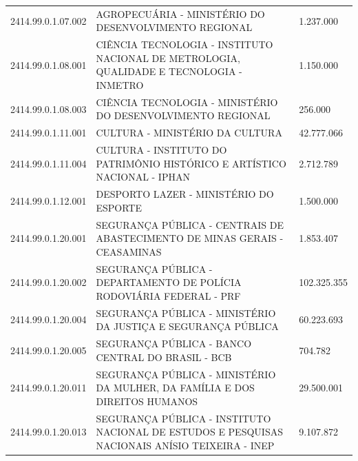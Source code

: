 \documentclass{article}
\begin{document}
\begin{longtable}[c]{m{2cm}|m{13cm}|m{2cm}}
\multicolumn{1}{C{2cm}|}{2414.99.0.1.07.002} & \multicolumn{1}{L{13cm}|}{AGROPECUÁRIA - MINISTÉRIO DO DESENVOLVIMENTO REGIONAL} & \multicolumn{1}{R{2cm}}{1.237.000} \\
\multicolumn{1}{C{2cm}|}{2414.99.0.1.08.001} & \multicolumn{1}{L{13cm}|}{CIÊNCIA TECNOLOGIA - INSTITUTO NACIONAL DE METROLOGIA, QUALIDADE E TECNOLOGIA - INMETRO} & \multicolumn{1}{R{2cm}}{1.150.000} \\
\multicolumn{1}{C{2cm}|}{2414.99.0.1.08.003} & \multicolumn{1}{L{13cm}|}{CIÊNCIA TECNOLOGIA - MINISTÉRIO DO DESENVOLVIMENTO REGIONAL} & \multicolumn{1}{R{2cm}}{256.000} \\
\multicolumn{1}{C{2cm}|}{2414.99.0.1.11.001} & \multicolumn{1}{L{13cm}|}{CULTURA - MINISTÉRIO DA CULTURA} & \multicolumn{1}{R{2cm}}{42.777.066} \\
\multicolumn{1}{C{2cm}|}{2414.99.0.1.11.004} & \multicolumn{1}{L{13cm}|}{CULTURA - INSTITUTO DO PATRIMÔNIO HISTÓRICO E ARTÍSTICO NACIONAL - IPHAN} & \multicolumn{1}{R{2cm}}{2.712.789} \\
\multicolumn{1}{C{2cm}|}{2414.99.0.1.12.001} & \multicolumn{1}{L{13cm}|}{DESPORTO LAZER - MINISTÉRIO DO ESPORTE} & \multicolumn{1}{R{2cm}}{1.500.000} \\
\multicolumn{1}{C{2cm}|}{2414.99.0.1.20.001} & \multicolumn{1}{L{13cm}|}{SEGURANÇA PÚBLICA - CENTRAIS DE ABASTECIMENTO DE MINAS GERAIS - CEASAMINAS} & \multicolumn{1}{R{2cm}}{1.853.407} \\
\multicolumn{1}{C{2cm}|}{2414.99.0.1.20.002} & \multicolumn{1}{L{13cm}|}{SEGURANÇA PÚBLICA - DEPARTAMENTO DE POLÍCIA RODOVIÁRIA FEDERAL - PRF} & \multicolumn{1}{R{2cm}}{102.325.355} \\
\multicolumn{1}{C{2cm}|}{2414.99.0.1.20.004} & \multicolumn{1}{L{13cm}|}{SEGURANÇA PÚBLICA - MINISTÉRIO DA JUSTIÇA E SEGURANÇA PÚBLICA} & \multicolumn{1}{R{2cm}}{60.223.693} \\
\multicolumn{1}{C{2cm}|}{2414.99.0.1.20.005} & \multicolumn{1}{L{13cm}|}{SEGURANÇA PÚBLICA - BANCO CENTRAL DO BRASIL - BCB} & \multicolumn{1}{R{2cm}}{704.782} \\
\multicolumn{1}{C{2cm}|}{2414.99.0.1.20.011} & \multicolumn{1}{L{13cm}|}{SEGURANÇA PÚBLICA - MINISTÉRIO DA MULHER, DA FAMÍLIA E DOS DIREITOS HUMANOS} & \multicolumn{1}{R{2cm}}{29.500.001} \\
\multicolumn{1}{C{2cm}|}{2414.99.0.1.20.013} & \multicolumn{1}{L{13cm}|}{SEGURANÇA PÚBLICA - INSTITUTO NACIONAL DE ESTUDOS E PESQUISAS NACIONAIS ANÍSIO TEIXEIRA - INEP} & \multicolumn{1}{R{2cm}}{9.107.872} \\

\end{longtable}
\end{document}
